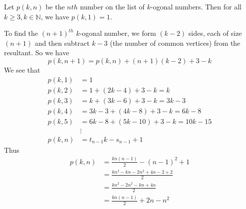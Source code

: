 
    \begin{solution}
        Let $p(k,n)$ be the $nth$ number on the list of
        $k$-ogonal numbers. Then for all $k\ge3,
        k\in\mathbb{N}$, we have $p(k,1)=1$.

        To find the $(n+1)^{th}$ $k$-ogonal number, we 
        form $(k-2)$ sides, each of size $(n+1)$ and then 
        subtract $k-3$ (the number of common vertices)
        from the resultant. So we have
        $$p(k,n+1)=p(k,n)+(n+1)(k-2)+3-k$$
        We see that
        \begin{align*}
            p(k,1) &= 1\\
            p(k,2) &= 1+(2k-4)+3-k=k\\
            p(k,3) &= k+(3k-6)+3-k=3k-3\\
            p(k,4) &= 3k-3+(4k-8)+3-k=6k-8\\
            p(k,5) &= 6k-8+(5k-10)+3-k=10k-15\\
            &\vdots\\
            p(k,n) &= t_{n-1}k-s_{n-1} +1
        \end{align*}
        Thus
        \begin{align*}
            p(k,n) &= \frac{kn(n-1)}{2}-(n-1)^2+1\\
                   &= \frac{kn^2-kn-2n^2+4n-2+2}{2}\\
                   &= \frac{kn^2-2n^2-kn+4n}{2}\\
                   &= \frac{kn(n-1)}{2}+2n-n^2\\
        \end{align*}
        \qedsymbol
    \end{solution}